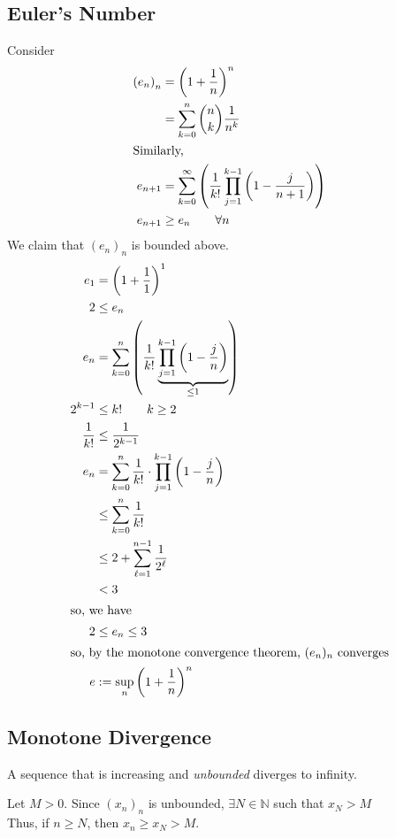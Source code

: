 \documentclass[10pt]{extarticle}
\newcommand{\N}{\mathbb{N}}
\begin{document}
  \subsection{Euler's Number}%
    Consider
    \begin{align*}
      \left(e_n\right)_n &= \left(1 + \frac{1}{n}\right)^n\\
                         &= \sum_{k=0}^{n} {n\choose k}\frac{1}{n^k}\\
                         \shortintertext{Similarly,}
      e_{n+1} &= \sum_{k=0}^{\infty}\left(\frac{1}{k!} \prod_{j=1}^{k-1}\left(1-\frac{j}{n+1}\right)\right)\\
      e_{n+1} &\geq e_{n} \tag*{$\forall n$}
    \end{align*}
    We claim that $(e_n)_n$ is bounded above.
    \begin{align*}
      e_{1} &= \left(1 + \frac{1}{1}\right)^{1}\\
      2 &\leq e_n\\
      e_{n} &= \sum_{k=0}^{n}\left(\frac{1}{k!} \underbrace{\prod_{j=1}^{k-1}\left(1-\frac{j}{n}\right)}_{\leq 1}\right)\\
      2^{k-1} &\leq k!\tag*{$k\geq 2$}\\
      \frac{1}{k!} &\leq \frac{1}{2^{k-1}}\\
      e_{n} &= \sum_{k=0}^{n} \frac{1}{k!} \cdot \prod_{j=1}^{k-1}\left(1 - \frac{j}{n}\right)\\
            &\leq \sum_{k=0}^{n}\frac{1}{k!}\\
            &\leq 2 + \sum_{\ell=1}^{n-1} \frac{1}{2^{\ell}}\\
            &< 3\\
            \shortintertext{so, we have}
      2 &\leq e_{n} \leq 3\\
      \shortintertext{so, by the monotone convergence theorem, $(e_n)_n$ converges}
      e &:= \sup_{n}\left(1 + \frac{1}{n}\right)^{n}
    \end{align*}
  \subsection{Monotone Divergence}%
  A sequence that is increasing and \textsl{unbounded} diverges to infinity.

    Let $M > 0$. Since $\left(x_{n}\right)_n$ is unbounded, $\exists N\in\N$ such that $x_{N} > M$\\

    Thus, if $n \geq N$, then $x_{n} \geq x_{N} > M$.\\
\end{document}
